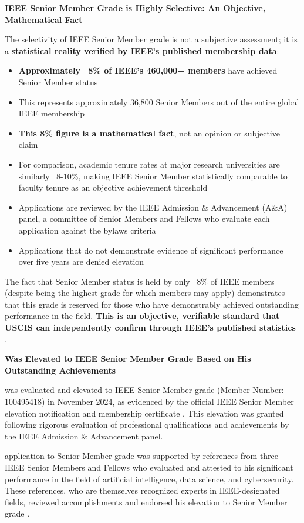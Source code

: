\textbf{IEEE Senior Member Grade is Highly Selective: An Objective, Mathematical Fact}

The selectivity of IEEE Senior Member grade is not a subjective assessment; it is a \textbf{statistical reality verified by IEEE's published membership data}:

\begin{itemize}
    \item \textbf{Approximately ~8\% of IEEE's 460,000+ members} have achieved Senior Member status
    \item This represents approximately 36,800 Senior Members out of the entire global IEEE membership
    \item \textbf{This 8\% figure is a mathematical fact}, not an opinion or subjective claim
    \item For comparison, academic tenure rates at major research universities are similarly ~8-10\%, making IEEE Senior Member statistically comparable to faculty tenure as an objective achievement threshold
    \item Applications are reviewed by the IEEE Admission \& Advancement (A\&A) panel, a committee of Senior Members and Fellows who evaluate each application against the bylaws criteria
    \item Applications that do not demonstrate evidence of significant performance over five years are denied elevation
\end{itemize}

The fact that Senior Member status is held by only ~8\% of IEEE members (despite being the highest grade for which members may apply) demonstrates that this grade is reserved for those who have demonstrably achieved outstanding performance in the field. \textbf{This is an objective, verifiable standard that USCIS can independently confirm through IEEE's published statistics} \cite{ieeeseniormemberbylaw}.

\textbf{\dr Was Elevated to IEEE Senior Member Grade Based on His Outstanding Achievements}

\dr was evaluated and elevated to IEEE Senior Member grade (Member Number: 100495418) in November 2024, as evidenced by the official IEEE Senior Member elevation notification and membership certificate \cite{ieeeseniorresults}. This elevation was granted following rigorous evaluation of \drs professional qualifications and achievements by the IEEE Admission \& Advancement panel.

\drs application to Senior Member grade was supported by references from three IEEE Senior Members and Fellows who evaluated and attested to his significant performance in the field of artificial intelligence, data science, and cybersecurity. These references, who are themselves recognized experts in IEEE-designated fields, reviewed \drs accomplishments and endorsed his elevation to Senior Member grade \cite{ieeevouchers}.

